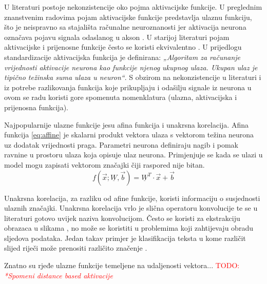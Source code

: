 \documentclass[times, utf8, numeric, diplomski]{fer}
\def\mat#1{\underline{#1}}
\def\TODO#1{\noindent\textcolor{red}{TODO: \textit{#1}}\newline}
\def\todo#1{\TODO{#1}}
\begin{document}
U literaturi postoje nekonzistencije oko pojma aktivacijske funkcije. U preglednim znanstvenim radovima \citep{function_survey1, function_survey2, function_survey3} pojam aktivacijske funkcije predstavlja ulaznu funkciju, što je neispravno sa stajališta računalne neuroznanosti jer aktivacija neurona označava pojavu signala odaslanog u akson \citep[p.~234]{neuroscience}. U starijoj literaturi pojam aktivacijske i prijenosne funkcije često se koristi ekvivalentno \citep{evolving_transfer, evo_parsimonious}. U prijedlogu standardizacije \citet{ieee_standardization} aktivacijska funkcija je definirana: \textit{„Algoritam za računanje vrijednosti aktivacije neurona kao funkcije njenog ukupnog ulaza. Ukupan ulaz je tipično težinska suma ulaza u neuron“}. S obzirom na nekonzistencije u literaturi i iz potrebe razlikovanja funkcija koje prikupljaju i odašilju signale iz neurona u ovom se radu koristi gore spomenuta nomenklatura (ulazna, aktivacijska i prijenosna funkcija).

Najpopularnije ulazne funkcije jesu afina funkcija i unakrsna korelacija.
Afina funkcija \eqref{eq:affine} je skalarni produkt vektora ulaza s vektorom težina neurona uz dodatak vrijednosti praga. Parametri neurona definiraju nagib i pomak ravnine u prostoru ulaza koja opisuje ulaz neurona. Primjenjuje se kada se ulazi u model mogu zapisati vektorom značajki čiji raspored nije bitan.
\begin{equation}
\label{eq:affine}
f(\vec{x};\mat{W},\vec{b})=\mat{W}^T \cdot \vec{x} + \vec{b}
\end{equation}

Unakrsna korelacija, za razliku od afine funkcije, koristi informaciju o susjednosti ulaznih značajki. Unakrsna korelacija vrlo je slična operatoru konvolucije te se u literaturi gotovo uvijek naziva konvolucijom. Često se koristi za ekstrakciju obrazaca u slikama \citep{alexnet}, no može se koristiti u problemima koji zahtijevaju obradu sljedova podataka. Jedan takav primjer je klasifikacija teksta u kome različit slijed riječi može prenositi različito značenje \citep{char_cnn}.

Znatno su rjeđe ulazne funkcije temeljene na udaljenosti vektora... \citep{function_survey1}
\todo{*Spomeni distance based aktivacije}
\end{document}
